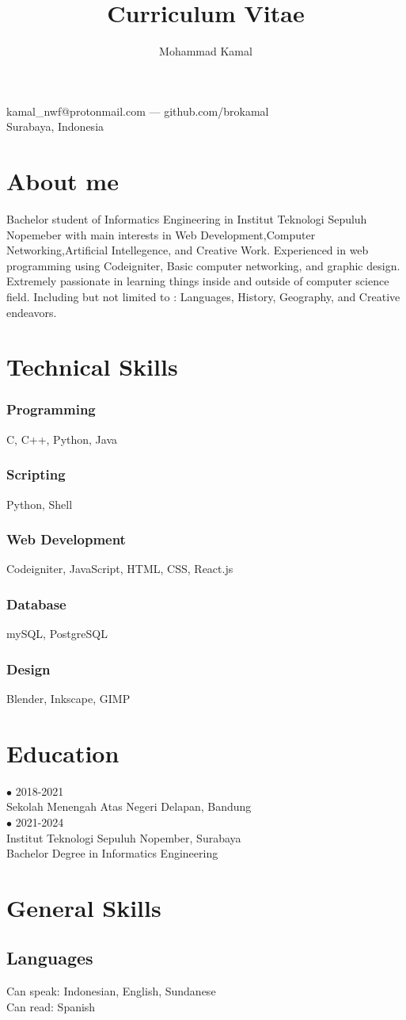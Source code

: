 \documentclass{article}
\makeatletter
\renewcommand{\maketitle}{
\begin{center}
{\huge\bfseries
\theauthor}




\vspace{.25em}

kamal\_nwf@protonmail.com --- github.com/brokamal \\
Surabaya, Indonesia 

\end{center}

}
\makeatother
\begin{document}
\title{Curriculum Vitae}
\author{Mohammad Kamal}

\maketitle

\section{About me}
Bachelor student of Informatics Engineering in Institut Teknologi Sepuluh Nopemeber with main interests in Web Development,Computer Networking,Artificial Intellegence, and Creative Work. Experienced in web programming using Codeigniter, Basic computer networking, and graphic design. 
\\[1em]
Extremely passionate in learning things inside and outside of computer science field. Including but not limited to : Languages, History, Geography, and Creative endeavors. 
\section{Technical Skills}



\subsubsection{Programming}
C, C++, Python, Java
\subsubsection{Scripting}
Python, Shell

\subsubsection{Web Development}
Codeigniter, JavaScript, HTML, CSS, React.js 

\subsubsection{Database}
mySQL, PostgreSQL

\subsubsection{Design}
Blender, Inkscape, GIMP

\section{Education}
{\Large $ \bullet $ 2018-2021} \\
{Sekolah Menengah Atas Negeri Delapan, Bandung}
\\[2em]
{\Large $ \bullet $ 2021-2024} \\
{Institut Teknologi Sepuluh Nopember, Surabaya}
\\
{Bachelor Degree in Informatics Engineering}


\section{General Skills}

\subsection{Languages}
Can speak: Indonesian, English, Sundanese \\
Can read: Spanish 
\end{document}
